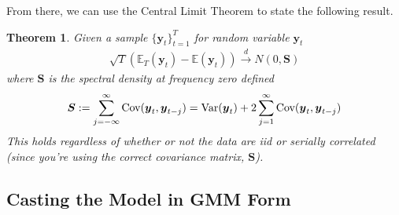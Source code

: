 \documentclass[12pt]{article}
\theoremstyle{plain}
\newtheorem{thm}{Theorem}[section]
\theoremstyle{definition}
\theoremstyle{remark}
\begin{document}
From there, we can use the Central Limit Theorem to state the following
result.

\begin{thm}
Given a sample $\{\boldsymbol{y}_t\}_{t=1}^T$ for random variable
$\boldsymbol{y}_t$
\begin{align*}
  \sqrt{T}\left(
    \mathbb{E}_T(\boldsymbol{y}_t) -\mathbb{E}(\boldsymbol{y}_t)
  \right)
  \xrightarrow{d} N(0,\boldsymbol{S})
\end{align*}
where $\boldsymbol{S}$ is the spectral density at frequency zero defined
\begin{align*}
  \boldsymbol{S} :=
  \sum^\infty_{j=-\infty}
    \text{\normalfont Cov}(\boldsymbol{y}_t, \boldsymbol{y}_{t-j})
  =
  \text{\normalfont Var}(\boldsymbol{y}_t)
  + 2 \sum^\infty_{j=1}
  \text{\normalfont Cov}(\boldsymbol{y}_t,\boldsymbol{y}_{t-j})
\end{align*}
This holds regardless of whether or not the data are iid or serially
correlated (since you're using the correct covariance matrix,
$\boldsymbol{S}$).
\end{thm}

\clearpage
\subsection{Casting the Model in GMM Form}
\end{document}
